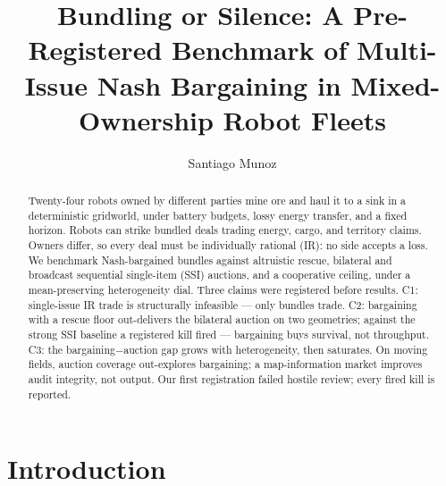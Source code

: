 \documentclass[sigconf,nonacm]{acmart}
\begin{document}
\title{Bundling or Silence: A Pre-Registered Benchmark of Multi-Issue Nash
Bargaining in Mixed-Ownership Robot Fleets}

\author{Santiago Munoz}
\renewcommand{\shortauthors}{Munoz}

\begin{abstract}
Twenty-four robots owned by different parties mine ore and haul it to a
sink in a deterministic gridworld, under battery budgets, lossy energy
transfer, and a fixed horizon. Robots can strike bundled deals trading
energy, cargo, and territory claims. Owners differ, so every deal must be
individually rational (IR): no side accepts a loss. We benchmark
Nash-bargained bundles against altruistic rescue, bilateral and broadcast
sequential single-item (SSI) auctions, and a cooperative ceiling, under a
mean-preserving heterogeneity dial. Three claims were registered before
results. C1: single-issue IR trade is structurally infeasible --- only
bundles trade. C2: bargaining with a rescue floor out-delivers the
bilateral auction on two geometries; against the strong SSI baseline a
registered kill fired --- bargaining buys survival, not throughput. C3: the
bargaining$-$auction gap grows with heterogeneity, then saturates. On
moving fields, auction coverage out-explores bargaining; a map-information
market improves audit integrity, not output. Our first registration failed
hostile review; every fired kill is reported.
\end{abstract}


\maketitle

\section{Introduction}\label{sec:intro}
\end{document}
